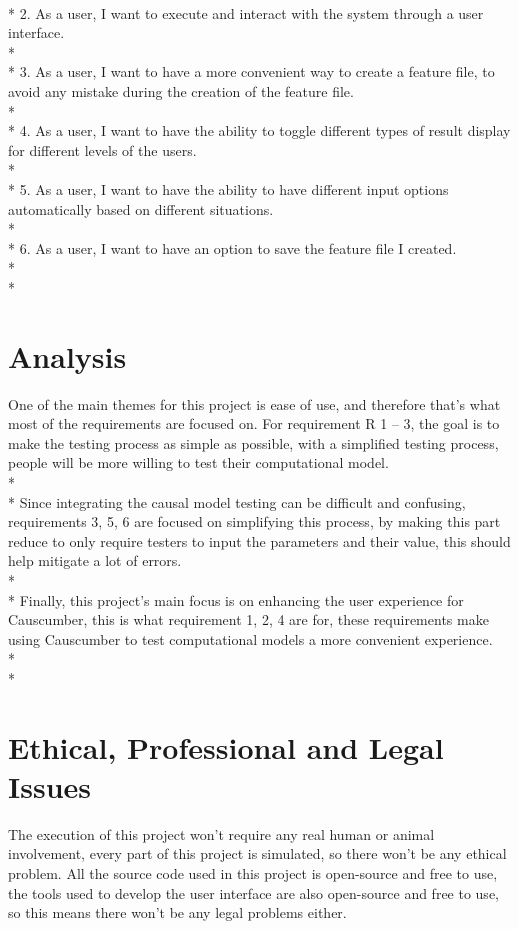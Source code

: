 \\*
2. As a user, I want to execute and interact with the system through a user interface.\\*
\\*
3. As a user, I want to have a more convenient way to create a feature file, to avoid any mistake during the creation of the feature file.\\*
\\*
4. As a user, I want to have the ability to toggle different types of result display for different levels of the users. \\*
\\*
5. As a user, I want to have the ability to have different input options automatically based on different situations. \\*
\\*
6. As a user, I want to have an option to save the feature file I created. \\*
\\*



\section{Analysis}
One of the main themes for this project is ease of use, and therefore that’s what most of the requirements are focused on. For requirement R 1 – 3, the goal is to make the testing process as simple as possible, with a simplified testing process, people will be more willing to test their computational model. \\*\\*
Since integrating the causal model testing can be difficult and confusing, requirements 3, 5, 6 are focused on simplifying this process, by making this part reduce to only require testers to input the parameters and their value, this should help mitigate a lot of errors. \\*\\*
Finally, this project’s main focus is on enhancing the user experience for Causcumber, this is what requirement 1, 2, 4 are for, these requirements make using Causcumber to test computational models a more convenient experience. \\*\\*

\section{Ethical, Professional and Legal Issues}

The execution of this project won’t require any real human or animal involvement, every part of this project is simulated, so there won’t be any ethical problem. All the source code used in this project is open-source and free to use, the tools used to develop the user interface are also open-source and free to use, so this means there won’t be any legal problems either. 



